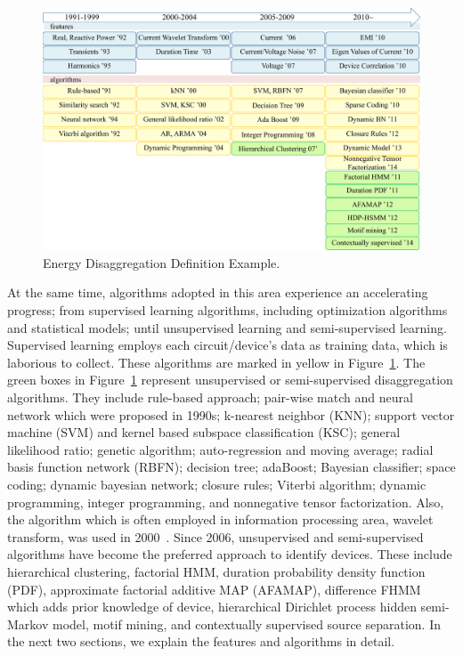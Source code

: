 \begin{figure}[ht]
\centering
\includegraphics[width=5in]{figs/timeline.pdf}
\caption{Energy Disaggregation Definition Example.}
\label{fig_timeline}
\end{figure}

At the same time,
algorithms adopted in this area experience an accelerating progress;
from supervised learning algorithms, including optimization algorithms 
and statistical models; 
until unsupervised learning and semi-supervised learning.
Supervised learning employs each circuit/device's data
as training data, which is laborious to collect.
These algorithms are marked in yellow in Figure~\ref{fig_timeline}. 
The green boxes in Figure~\ref{fig_timeline} represent unsupervised or semi-supervised disaggregation algorithms.
They include rule-based approach; pair-wise match
and neural  network which were proposed in 1990s;
k-nearest neighbor (KNN); support vector machine (SVM) and kernel based
subspace classification (KSC); general likelihood ratio;
genetic algorithm; auto-regression and moving average; 
radial basis function network (RBFN);
decision tree; adaBoost; Bayesian classifier;
space coding; dynamic bayesian network; closure rules;
Viterbi algorithm; dynamic programming, integer programming, 
and nonnegative tensor factorization.
Also, the algorithm which is often employed in
information processing area, wavelet transform,
was used in 2000~\cite{chan2000harmonics}.
Since 2006, unsupervised and semi-supervised algorithms
have become the preferred approach to identify devices.
These include hierarchical clustering,
factorial HMM, duration probability density function (PDF),
approximate factorial additive MAP (AFAMAP),
difference FHMM which adds prior knowledge of device, 
hierarchical Dirichlet process hidden semi-Markov model,
motif mining, and contextually supervised source separation. 
In the next two sections, we explain the features and algorithms in detail.




